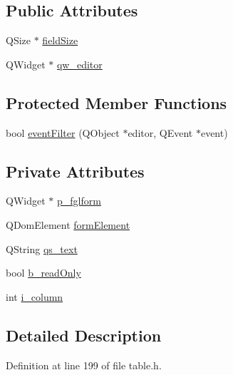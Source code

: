\subsection*{Public Attributes}
\begin{DoxyCompactItemize}
\item 
QSize $\ast$ \hyperlink{classLineEditDelegate_ace648742ec01e245e35b39261383ae89}{fieldSize}
\item 
QWidget $\ast$ \hyperlink{classLineEditDelegate_a16d00d8e62e3c89978d07adcffa007c9}{qw\_\-editor}
\end{DoxyCompactItemize}
\subsection*{Protected Member Functions}
\begin{DoxyCompactItemize}
\item 
bool \hyperlink{classLineEditDelegate_acc5efdbc01898262cc1050dc696aad6a}{eventFilter} (QObject $\ast$editor, QEvent $\ast$event)
\end{DoxyCompactItemize}
\subsection*{Private Attributes}
\begin{DoxyCompactItemize}
\item 
QWidget $\ast$ \hyperlink{classLineEditDelegate_a2f504917f4de35dd8f400d8d696bdc1d}{p\_\-fglform}
\item 
QDomElement \hyperlink{classLineEditDelegate_aa635e6dd4afb8971b6d85db420c16773}{formElement}
\item 
QString \hyperlink{classLineEditDelegate_ad734b27bd24f9eebab7dc0b0a70897a7}{qs\_\-text}
\item 
bool \hyperlink{classLineEditDelegate_ae056ae674734bac2b666e31071568fbd}{b\_\-readOnly}
\item 
int \hyperlink{classLineEditDelegate_a8484d34acb269d70d28e3ccaa98c8a49}{i\_\-column}
\end{DoxyCompactItemize}


\subsection{Detailed Description}


Definition at line 199 of file table.h.



